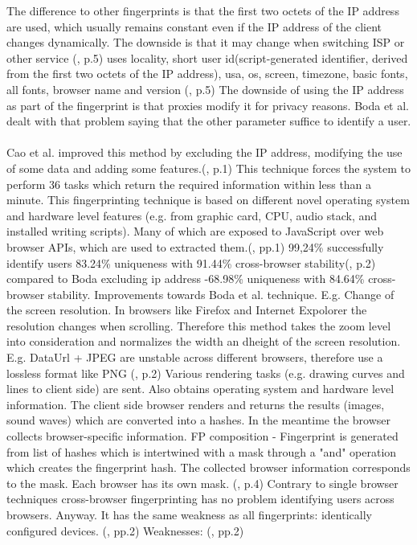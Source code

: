 The difference to other fingerprints is that the first two octets of the IP address are used, which usually remains constant even if the IP address of the client changes dynamically. The downside is that it may change when switching ISP or other service
(\textcite{boda11}, p.5)
uses locality, short user id(script-generated identifier, derived from the first two octets of the IP address), usa, os, screen, timezone, basic fonts, all fonts, browser name and version
(\textcite{boda11}, p.5)
The downside of using the IP address as part of the fingerprint is that proxies modify it for privacy reasons. Boda et al. dealt with that problem saying that the other parameter suffice to identify a user.\\\\
Cao et al. improved this method by excluding the IP address, modifying the use of some data and adding some features.(\textcite{Cao17}, p.1) This technique forces the system to perform 36 tasks which return the required information within less than a minute.
This fingerprinting technique is based on different novel operating system and hardware level features (e.g. from graphic card, CPU, audio stack, and installed writing scripts). Many of which are exposed to JavaScript over web browser APIs, which are used to extracted them.(\textcite{Cao17}, pp.1)
99,24\%  successfully identify users 
83.24\% uniqueness with 91.44\% cross-browser stability(\textcite{Cao17}, p.2)
compared to Boda excluding ip address -68.98\% uniqueness with 84.64\% cross-browser stability.
Improvements towards Boda et al. technique. 
E.g. Change of the screen resolution. In browsers like Firefox and Internet Expolorer the resolution changes when scrolling. Therefore this method takes the zoom level into consideration and normalizes the width an dheight of the screen resolution.
E.g. DataUrl + JPEG are unstable across different browsers, therefore use a lossless format like PNG 
(\textcite{Cao17}, p.2)
Various rendering tasks (e.g. drawing curves and lines to client side) are sent. Also obtains operating system and hardware level information. The client side browser renders and returns the results (images, sound waves) which are converted into a hashes. In the meantime the browser collects browser-specific information.
FP composition - Fingerprint is generated from list of hashes which is intertwined with a mask through a "and" operation which creates the fingerprint hash.
The collected browser information corresponds to the mask. Each browser has its own mask. (\textcite{Cao17}, p.4)
Contrary to single browser techniques cross-browser fingerprinting has no problem identifying users across browsers. Anyway. It has the same weakness as all fingerprints: identically configured devices. (\textcite{upi15}, pp.2)
Weaknesses: (\textcite{upi15}, pp.2)

